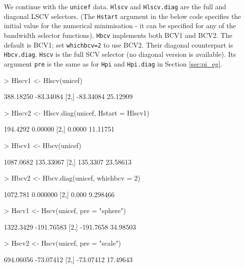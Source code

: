 \documentclass[a4paper,11pt]{article}
\begin{document}
We continue with the \texttt{unicef} data. 
\texttt{Hlscv} and \texttt{Hlscv.diag} are the full and diagonal
LSCV selectors. (The \texttt{Hstart} argument in the below code specifies the initial
value for the numerical minimisation - it can be specified
for any of the bandwidth selector functions). 
\texttt{Hbcv} implements both BCV1 and BCV2. The
default is BCV1; set \texttt{whichbcv=2} to use BCV2.
Their diagonal counterpart is \texttt{Hbcv.diag}. 
\texttt{Hscv} is the full SCV selector (no diagonal version is available).
Its argument \texttt{pre} is the same as for \texttt{Hpi} and \texttt{Hpi.diag}
in Section \ref{sec:pi_eg}.  
\begin{Schunk}
\begin{Sinput}
> Hlscv1 <- Hlscv(unicef)
\end{Sinput}
\begin{Soutput}
          [,1]      [,2]
[1,] 388.18250 -83.34084
[2,] -83.34084  25.12909
\end{Soutput}
\begin{Sinput}
> Hlscv2 <- Hlscv.diag(unicef, Hstart = Hlscv1)
\end{Sinput}
\begin{Soutput}
         [,1]     [,2]
[1,] 194.4292  0.00000
[2,]   0.0000 11.11751
\end{Soutput}
\begin{Sinput}
> Hbcv1 <- Hbcv(unicef)
\end{Sinput}
\begin{Soutput}
          [,1]      [,2]
[1,] 1087.0682 135.33067
[2,]  135.3307  23.58613
\end{Soutput}
\begin{Sinput}
> Hbcv2 <- Hbcv.diag(unicef, whichbcv = 2)
\end{Sinput}
\begin{Soutput}
         [,1]     [,2]
[1,] 1072.781 0.000000
[2,]    0.000 9.298466
\end{Soutput}
\begin{Sinput}
> Hscv1 <- Hscv(unicef, pre = "sphere")
\end{Sinput}
\begin{Soutput}
          [,1]       [,2]
[1,] 1322.3429 -191.76583
[2,] -191.7658   34.98503
\end{Soutput}
\begin{Sinput}
> Hscv2 <- Hscv(unicef, pre = "scale")
\end{Sinput}
\begin{Soutput}
          [,1]      [,2]
[1,] 694.06056 -73.07412
[2,] -73.07412  17.49643
\end{Soutput}
\end{Schunk}
\end{document}
